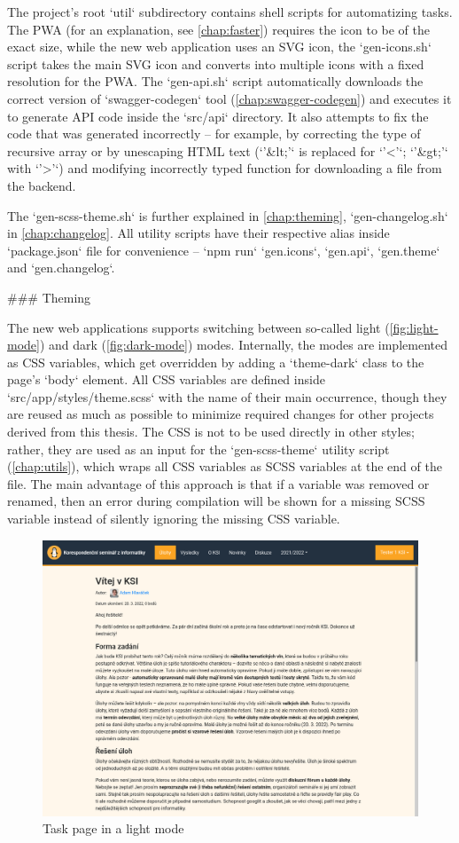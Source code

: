 \documentclass[
  digital, %
  oneside, %
  lof,     %
  nolot,     %
]{fithesis4}
\begin{document}
{The project's root `util` subdirectory contains shell scripts for automatizing tasks. The \acrshort{PWA} (for an explanation, see \autoref{chap:faster}) requires the icon to be of the exact size, while the new web application uses an \acrshort{SVG} icon, the `gen-icons.sh` script takes the main \acrshort{SVG} icon and converts into multiple icons with a fixed resolution for the \acrshort{PWA}. The `gen-api.sh` script automatically downloads the correct version of `swagger-codegen` tool (\autoref{chap:swagger-codegen}) and executes it to generate \acrshort{API} code inside the `src/api` directory. It also attempts to fix the code that was generated incorrectly -- for example, by correcting the type of recursive array or by unescaping HTML text (`'&lt;'` is replaced for `'<'`; `'&gt;'` with `'>'`) and modifying incorrectly typed function for downloading a file from the backend.

The `gen-scss-theme.sh` is further explained in \autoref{chap:theming}, `gen-changelog.sh` in \autoref{chap:changelog}. All utility scripts have their respective alias inside `package.json` file for convenience -- `npm run` `gen.icons`, `gen.api`, `gen.theme` and `gen.changelog`. 

### Theming
\label{chap:theming}

The new web applications supports switching between so-called light (\autoref{fig:light-mode}) and dark (\autoref{fig:dark-mode}) modes. Internally, the modes are implemented as \acrshort{CSS} variables, which get overridden by adding a `theme-dark` class to the page's `body` element. All \acrshort{CSS} variables are defined inside `src/app/styles/theme.scss` with the name of their main occurrence, though they are reused as much as possible to minimize required changes for other projects derived from this thesis. The \acrshort{CSS} is not to be used directly in other styles; rather, they are used as an input for the `gen-scss-theme` utility script (\autoref{chap:utils}), which wraps all \acrshort{CSS} variables as SCSS variables at the end of the file. The main advantage of this approach is that if a variable was removed or renamed, then an error during compilation will be shown for a missing SCSS variable instead of silently ignoring the missing \acrshort{CSS} variable.

\begin{figure}
\includegraphics[width=.8\textwidth]{assets/img/light-mode}
\caption{Task page in a light mode}
\label{fig:light-mode}
\end{figure}

}
\end{document}
